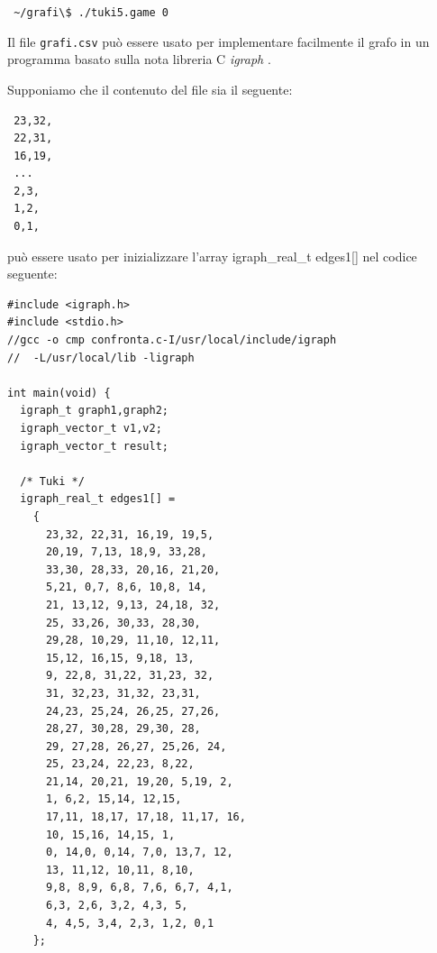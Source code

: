 \documentclass[8pt]{book}
\begin{document}
\texttt{
\textasciitilde{}/grafi\textbackslash{}\$ ./tuki5.game 0
}


Il file \texttt{grafi.csv} può essere usato per implementare facilmente il grafo in un programma basato sulla nota libreria C \emph{igraph} .

Supponiamo che il contenuto del file sia il seguente:

\begin{spacing}{0.9}
  \begin{small}
\begin{tcolorbox}
\begin{verbatim}
 23,32,
 22,31,
 16,19,
 ...
 2,3,
 1,2,
 0,1,
\end{verbatim}
    \end{tcolorbox}
  \end{small}
\end{spacing}

può essere usato per inizializzare l'array igraph\_real\_t edges1{[}{]} nel codice seguente:

\begin{spacing}{0.9}
  \begin{small}
\begin{tcolorbox}
\begin{verbatim}
#include <igraph.h>
#include <stdio.h>
//gcc -o cmp confronta.c-I/usr/local/include/igraph
//  -L/usr/local/lib -ligraph

int main(void) {
  igraph_t graph1,graph2;
  igraph_vector_t v1,v2;
  igraph_vector_t result;
  
  /* Tuki */
  igraph_real_t edges1[] =
    {
      23,32, 22,31, 16,19, 19,5,
      20,19, 7,13, 18,9, 33,28,
      33,30, 28,33, 20,16, 21,20,
      5,21, 0,7, 8,6, 10,8, 14,
      21, 13,12, 9,13, 24,18, 32,
      25, 33,26, 30,33, 28,30,
      29,28, 10,29, 11,10, 12,11,
      15,12, 16,15, 9,18, 13,
      9, 22,8, 31,22, 31,23, 32,
      31, 32,23, 31,32, 23,31,
      24,23, 25,24, 26,25, 27,26,
      28,27, 30,28, 29,30, 28,
      29, 27,28, 26,27, 25,26, 24,
      25, 23,24, 22,23, 8,22,
      21,14, 20,21, 19,20, 5,19, 2,
      1, 6,2, 15,14, 12,15,
      17,11, 18,17, 17,18, 11,17, 16,
      10, 15,16, 14,15, 1,
      0, 14,0, 0,14, 7,0, 13,7, 12,
      13, 11,12, 10,11, 8,10,
      9,8, 8,9, 6,8, 7,6, 6,7, 4,1,
      6,3, 2,6, 3,2, 4,3, 5,
      4, 4,5, 3,4, 2,3, 1,2, 0,1
    };

\end{verbatim}
    \end{tcolorbox}
  \end{small}
\end{spacing}
\end{document}
